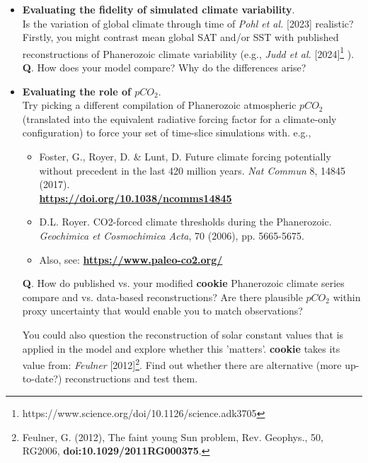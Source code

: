 \begin{itemize}[noitemsep]

\vspace{1mm}
\item \textbf{Evaluating the fidelity of simulated climate variability}.
\\Is the variation of global climate through time of \textit{Pohl et al.} [2023] realistic?
\\Firstly, you might contrast mean global SAT and/or SST with published reconstructions of Phanerozoic climate variability (e.g., \textit{Judd et al.} [2024]\footnote{https://www.science.org/doi/10.1126/science.adk3705} ).
\\\textbf{Q}. How does your model compare? Why do the differences arise?

\vspace{1mm}
\item \textbf{Evaluating the role of $pCO_{2}$}.
\\Try picking a different compilation of Phanerozoic atmospheric $pCO_{2}$ (translated into the equivalent radiative forcing factor for a climate-only configuration) to force your set of time-slice simulations with. e.g.,
\begin{itemize}[noitemsep]
\vspace{1mm}
\item Foster, G., Royer, D. \& Lunt, D. Future climate forcing potentially without precedent in the last 420 million years. \textit{Nat Commun} 8, 14845 (2017). \\\textbf{\href{https://doi.org/10.1038/ncomms14845}{https://doi.org/10.1038/ncomms14845}}
\vspace{1mm}
\item D.L. Royer. CO2-forced climate thresholds during the Phanerozoic.
\textit{Geochimica et Cosmochimica Acta}, 70 (2006), pp. 5665-5675.
\vspace{1mm}
\item Also, see: \href{https://www.paleo-co2.org/}{\textbf{https://www.paleo-co2.org/}}
\end{itemize}

\textbf{Q}. How do published vs. your modified \textbf{cookie} Phanerozoic climate series compare and vs. data-based reconstructions? Are there plausible $pCO_{2}$ within proxy uncertainty that would enable you to match observations? 

You could also question the reconstruction of solar constant values that is applied in the model and explore whether this 'matters'. \textbf{cookie} takes its value from: \textit{Feulner} [2012]\footnote{Feulner, G. (2012), The faint young Sun problem, Rev. Geophys., 50, RG2006, \textbf{doi:10.1029/2011RG000375}.}. Find out whether there are alternative (more up-to-date?) reconstructions and test them.


\end{itemize}
